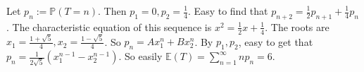 \documentclass{ctexart}
\begin{document}
\begin{solution}
  Let \(p_n:=\mathbb{P}(T=n)\). Then \(p_1=0,p_2=\frac{1}{4}\).
  Easy to find that \(p_{n+2}=\frac{1}{2}p_{n + 1}+\frac{1}{4}p_{n}\).
  The characteristic equation of this sequence is \(x^2=\frac{1}{2}x+\frac{1}{4}\).
  The roots are \(x_1=\frac{1+\sqrt{5}}{4},x_2=\frac{1-\sqrt{5}}{4}\).
  So \(p_n=Ax_1^n+Bx_2^n\). By \(p_1,p_2\), easy to get that
  \(p_n=\frac{1}{2 \sqrt{ 5}}\left(x_1^{n-1}-x_2^{n-1}\right)\).
  So easily \(\mathbb{E}(T)=\sum_{n=1}^{\infty} np_n=6\).
\end{solution}
\end{document}
